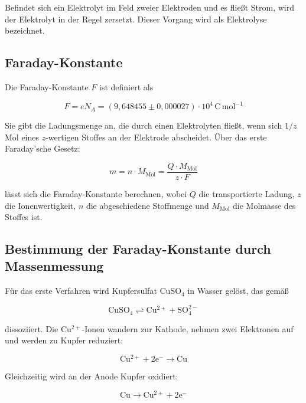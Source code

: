 Befindet sich ein Elektrolyt im Feld zweier Elektroden und es fließt Strom, wird der Elektrolyt in der Regel zersetzt. Dieser Vorgang wird als Elektrolyse bezeichnet.

\subsection{Faraday-Konstante}

Die Faraday-Konstante $F$ ist definiert als

\begin{equation}
F = e N_A = (9,648455 \pm 0,000027) \cdot 10^4 \,\mathrm{C\,mol^{-1}}
\label{eq:faraday}
\end{equation}

Sie gibt die Ladungsmenge an, die durch einen Elektrolyten fließt, wenn sich $1/z$ Mol eines $z$-wertigen Stoffes an der Elektrode abscheidet. Über das erste Faraday’sche Gesetz:

\begin{equation}
m = n \cdot M_\mathrm{Mol} = \frac{Q \cdot M_\mathrm{Mol}}{z \cdot F}
\label{eq:first_faraday}
\end{equation}

lässt sich die Faraday-Konstante berechnen, wobei $Q$ die transportierte Ladung, $z$ die Ionenwertigkeit, $n$ die abgeschiedene Stoffmenge und $M_\mathrm{Mol}$ die Molmasse des Stoffes ist.

\subsection{Bestimmung der Faraday-Konstante durch Massenmessung}

Für das erste Verfahren wird Kupfersulfat CuSO$_4$ in Wasser gelöst, das gemäß

\begin{equation}
\mathrm{CuSO_4 \rightleftharpoons Cu^{2+} + SO_4^{2-}}
\label{eq:cu_dissoziation}
\end{equation}

dissoziiert. Die Cu$^{2+}$-Ionen wandern zur Kathode, nehmen zwei Elektronen auf und werden zu Kupfer reduziert:

\begin{equation}
\mathrm{Cu^{2+} + 2e^- \rightarrow Cu}
\label{eq:cu_reduktion}
\end{equation}

Gleichzeitig wird an der Anode Kupfer oxidiert:

\begin{equation}
\mathrm{Cu \rightarrow Cu^{2+} + 2e^-}
\label{eq:cu_oxidation}
\end{equation}

